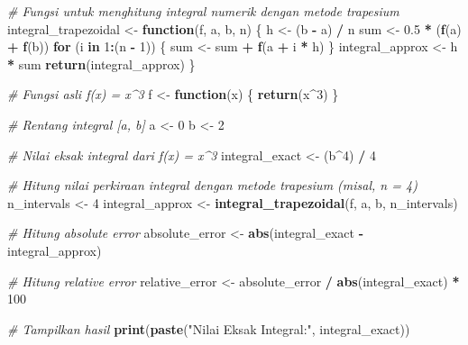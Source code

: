 \documentclass[
]{book}
\newenvironment{Shaded}{\begin{snugshade}}{\end{snugshade}}
\newcommand{\CommentTok}[1]{\textcolor[rgb]{0.56,0.35,0.01}{\textit{#1}}}
\newcommand{\ControlFlowTok}[1]{\textcolor[rgb]{0.13,0.29,0.53}{\textbf{#1}}}
\newcommand{\DecValTok}[1]{\textcolor[rgb]{0.00,0.00,0.81}{#1}}
\newcommand{\FloatTok}[1]{\textcolor[rgb]{0.00,0.00,0.81}{#1}}
\newcommand{\FunctionTok}[1]{\textcolor[rgb]{0.13,0.29,0.53}{\textbf{#1}}}
\newcommand{\NormalTok}[1]{#1}
\newcommand{\OtherTok}[1]{\textcolor[rgb]{0.56,0.35,0.01}{#1}}
\newcommand{\SpecialCharTok}[1]{\textcolor[rgb]{0.81,0.36,0.00}{\textbf{#1}}}
\newcommand{\StringTok}[1]{\textcolor[rgb]{0.31,0.60,0.02}{#1}}
\theoremstyle{definition}
\theoremstyle{definition}
\theoremstyle{definition}
\theoremstyle{definition}
\theoremstyle{remark}
\begin{document}
\begin{Shaded}
\begin{Highlighting}[]
\CommentTok{\# Fungsi untuk menghitung integral numerik dengan metode trapesium}
\NormalTok{integral\_trapezoidal }\OtherTok{\textless{}{-}} \ControlFlowTok{function}\NormalTok{(f, a, b, n) \{}
\NormalTok{  h }\OtherTok{\textless{}{-}}\NormalTok{ (b }\SpecialCharTok{{-}}\NormalTok{ a) }\SpecialCharTok{/}\NormalTok{ n}
\NormalTok{  sum }\OtherTok{\textless{}{-}} \FloatTok{0.5} \SpecialCharTok{*}\NormalTok{ (}\FunctionTok{f}\NormalTok{(a) }\SpecialCharTok{+} \FunctionTok{f}\NormalTok{(b))}
  \ControlFlowTok{for}\NormalTok{ (i }\ControlFlowTok{in} \DecValTok{1}\SpecialCharTok{:}\NormalTok{(n }\SpecialCharTok{{-}} \DecValTok{1}\NormalTok{)) \{}
\NormalTok{    sum }\OtherTok{\textless{}{-}}\NormalTok{ sum }\SpecialCharTok{+} \FunctionTok{f}\NormalTok{(a }\SpecialCharTok{+}\NormalTok{ i }\SpecialCharTok{*}\NormalTok{ h)}
\NormalTok{  \}}
\NormalTok{  integral\_approx }\OtherTok{\textless{}{-}}\NormalTok{ h }\SpecialCharTok{*}\NormalTok{ sum}
  \FunctionTok{return}\NormalTok{(integral\_approx)}
\NormalTok{\}}

\CommentTok{\# Fungsi asli f(x) = x\^{}3}
\NormalTok{f }\OtherTok{\textless{}{-}} \ControlFlowTok{function}\NormalTok{(x) \{}
  \FunctionTok{return}\NormalTok{(x}\SpecialCharTok{\^{}}\DecValTok{3}\NormalTok{)}
\NormalTok{\}}

\CommentTok{\# Rentang integral [a, b]}
\NormalTok{a }\OtherTok{\textless{}{-}} \DecValTok{0}
\NormalTok{b }\OtherTok{\textless{}{-}} \DecValTok{2}

\CommentTok{\# Nilai eksak integral dari f(x) = x\^{}3}
\NormalTok{integral\_exact }\OtherTok{\textless{}{-}}\NormalTok{ (b}\SpecialCharTok{\^{}}\DecValTok{4}\NormalTok{) }\SpecialCharTok{/} \DecValTok{4}

\CommentTok{\# Hitung nilai perkiraan integral dengan metode trapesium (misal, n = 4)}
\NormalTok{n\_intervals }\OtherTok{\textless{}{-}} \DecValTok{4}
\NormalTok{integral\_approx }\OtherTok{\textless{}{-}} \FunctionTok{integral\_trapezoidal}\NormalTok{(f, a, b, n\_intervals)}

\CommentTok{\# Hitung absolute error}
\NormalTok{absolute\_error }\OtherTok{\textless{}{-}} \FunctionTok{abs}\NormalTok{(integral\_exact }\SpecialCharTok{{-}}\NormalTok{ integral\_approx)}

\CommentTok{\# Hitung relative error}
\NormalTok{relative\_error }\OtherTok{\textless{}{-}}\NormalTok{ absolute\_error }\SpecialCharTok{/} \FunctionTok{abs}\NormalTok{(integral\_exact) }\SpecialCharTok{*} \DecValTok{100}

\CommentTok{\# Tampilkan hasil}
\FunctionTok{print}\NormalTok{(}\FunctionTok{paste}\NormalTok{(}\StringTok{"Nilai Eksak Integral:"}\NormalTok{, integral\_exact))}
\end{Highlighting}
\end{Shaded}
\end{document}
